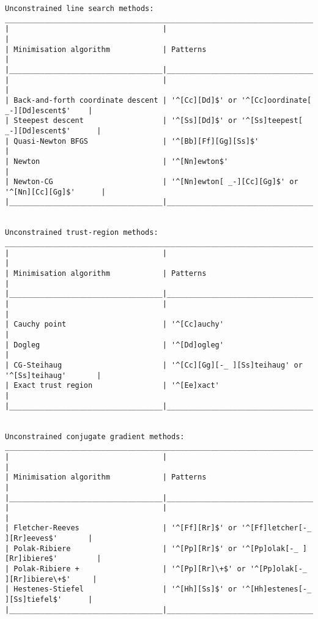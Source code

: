 \begin{verbatim}
Unconstrained line search methods:
___________________________________________________________________________________________
|                                   |                                                     |
| Minimisation algorithm            | Patterns                                            |
|___________________________________|_____________________________________________________|
|                                   |                                                     |
| Back-and-forth coordinate descent | '^[Cc][Dd]$' or '^[Cc]oordinate[ _-][Dd]escent$'    |
| Steepest descent                  | '^[Ss][Dd]$' or '^[Ss]teepest[ _-][Dd]escent$'      |
| Quasi-Newton BFGS                 | '^[Bb][Ff][Gg][Ss]$'                                |
| Newton                            | '^[Nn]ewton$'                                       |
| Newton-CG                         | '^[Nn]ewton[ _-][Cc][Gg]$' or '^[Nn][Cc][Gg]$'      |
|___________________________________|_____________________________________________________|


Unconstrained trust-region methods:
___________________________________________________________________________________________
|                                   |                                                     |
| Minimisation algorithm            | Patterns                                            |
|___________________________________|_____________________________________________________|
|                                   |                                                     |
| Cauchy point                      | '^[Cc]auchy'                                        |
| Dogleg                            | '^[Dd]ogleg'                                        |
| CG-Steihaug                       | '^[Cc][Gg][-_ ][Ss]teihaug' or '^[Ss]teihaug'       |
| Exact trust region                | '^[Ee]xact'                                         |
|___________________________________|_____________________________________________________|


Unconstrained conjugate gradient methods:
___________________________________________________________________________________________
|                                   |                                                     |
| Minimisation algorithm            | Patterns                                            |
|___________________________________|_____________________________________________________|
|                                   |                                                     |
| Fletcher-Reeves                   | '^[Ff][Rr]$' or '^[Ff]letcher[-_ ][Rr]eeves$'       |
| Polak-Ribiere                     | '^[Pp][Rr]$' or '^[Pp]olak[-_ ][Rr]ibiere$'         |
| Polak-Ribiere +                   | '^[Pp][Rr]\+$' or '^[Pp]olak[-_ ][Rr]ibiere\+$'     |
| Hestenes-Stiefel                  | '^[Hh][Ss]$' or '^[Hh]estenes[-_ ][Ss]tiefel$'      |
|___________________________________|_____________________________________________________|



\end{verbatim}
